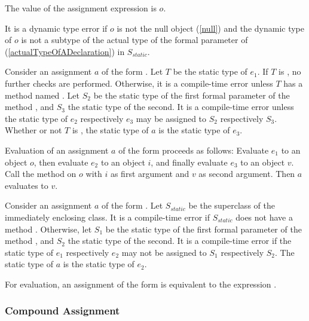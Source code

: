 \documentclass[makeidx]{article}
\begin{document}
{

\LMHash{}%
The value of the assignment expression is $o$.

\LMHash{}%
It is a dynamic type error if $o$ is not the null object (\ref{null})
and the dynamic type of $o$ is
not a subtype of the actual type of the formal parameter of 
(\ref{actualTypeOfADeclaration}) in $S_{static}$.
\EndCase

\LMHash{}%
Consider an assignment $a$ of the form .
Let $T$ be the static type of $e_1$.
If $T$ is \DYNAMIC{}, no further checks are performed.
Otherwise, it is a compile-time error unless
$T$ has a method named \code{[]=}.
Let $S_2$ be the static type of the
first formal parameter of the method \code{[]=},
and $S_3$ the static type of the second.
It is a compile-time error unless the static type of $e_2$ respectively $e_3$
may be assigned to $S_2$ respectively $S_3$.
Whether or not $T$ is \DYNAMIC{},
the static type of $a$ is the static type of $e_3$.

\LMHash{}%
Evaluation of an assignment $a$ of the form 
proceeds as follows:
Evaluate $e_1$ to an object $o$,
then evaluate $e_2$ to an object $i$,
and finally evaluate $e_3$ to an object $v$.
Call the method \code{[]=} on $o$
with $i$ as first argument and $v$ as second argument.
Then $a$ evaluates to $v$.
\EndCase

\LMHash{}%
Consider an assignment $a$ of the form .
Let $S_{static}$ be the superclass of the immediately enclosing class.
It is a compile-time error if $S_{static}$ does not have a method \code{[]=}.
Otherwise, let $S_1$ be the static type of the
first formal parameter of the method \code{[]=},
and $S_2$ the static type of the second.
It is a compile-time error if the static type of $e_1$ respectively $e_2$
may not be assigned to $S_1$ respectively $S_2$.
The static type of $a$ is the static type of $e_2$.

\LMHash{}%
For evaluation, an assignment of the form 
is equivalent to the expression .
\EndCase


\subsubsection{Compound Assignment}

}
\end{document}
